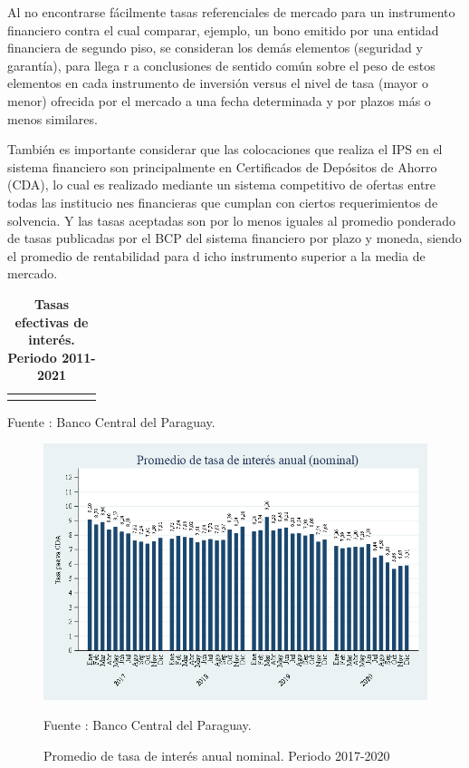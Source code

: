 Al no encontrarse fácilmente tasas referenciales de mercado para un
instrumento financiero contra el cual comparar, ejemplo, un bono emitido
por una entidad financiera de segundo piso, se consideran los demás
elementos (seguridad y garantía), para llega r a conclusiones de sentido
común sobre el peso de estos elementos en cada instrumento de inversión
versus el nivel de tasa (mayor o menor) ofrecida por el mercado a una
fecha determinada y por plazos más o menos similares.

También es importante considerar que las colocaciones que realiza el IPS
en el sistema financiero son principalmente en Certificados de Depósitos
de Ahorro (CDA), lo cual es realizado mediante un sistema competitivo de
ofertas entre todas las institucio nes financieras que cumplan con
ciertos requerimientos de solvencia. Y las tasas aceptadas son por lo
menos iguales al promedio ponderado de tasas publicadas por el BCP del
sistema financiero por plazo y moneda, siendo el promedio de
rentabilidad para d icho instrumento superior a la media de mercado.

\begin{table}[H]
\begin{center}
\caption{\bf{Tasas efectivas de interés. Periodo 2011-2021}}
\begin{tabular}{l|rrrrrr}
\scriptsize

\end{tabular}
                    \item \footnotesize Fuente : Banco Central del Paraguay. 
\end{center}
\end{table}

\begin{figure}[H]
\begin{center}
                    \caption{Promedio de tasa de interés anual nominal. Periodo 2017-2020}
                    \includegraphics[scale=0.55]{BCP_tasas_pasivas.png}
                                    \item \footnotesize Fuente : Banco Central del Paraguay. 
                    \end{center}
\end{figure}

